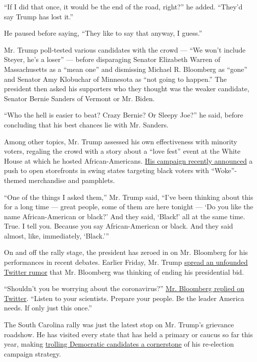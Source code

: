 ``If I did that once, it would be the end of the road, right?'' he
added. ``They'd say Trump has lost it.''

He paused before saying, ``They like to say that anyway, I guess.''

Mr. Trump poll-tested various candidates with the crowd --- ``We won't
include Steyer, he's a loser'' --- before disparaging Senator Elizabeth
Warren of Massachusetts as a ``mean one'' and dismissing Michael R.
Bloomberg as ``gone'' and Senator Amy Klobuchar of Minnesota as ``not
going to happen.'' The president then asked his supporters who they
thought was the weaker candidate, Senator Bernie Sanders of Vermont or
Mr. Biden.

``Who the hell is easier to beat? Crazy Bernie? Or Sleepy Joe?'' he
said, before concluding that his best chances lie with Mr. Sanders.

Among other topics, Mr. Trump assessed his own effectiveness with
minority voters, regaling the crowd with a story about a ``love fest''
event at the White House at which he hosted African-Americans.
\href{https://www.nytimes3xbfgragh.onion/2020/02/26/us/politics/trump-campaign-black-voters.html}{His
campaign recently announced} a push to open storefronts in swing states
targeting black voters with ``Woke''-themed merchandise and pamphlets.

``One of the things I asked them,'' Mr. Trump said, ``I've been thinking
about this for a long time --- great people, some of them are here
tonight --- `Do you like the name African-American or black?' And they
said, `Black!' all at the same time. True. I tell you. Because you say
African-American or black. And they said almost, like, immediately,
`Black.'''

On and off the rally stage, the president has zeroed in on Mr. Bloomberg
for his performances in recent debates. Earlier Friday, Mr. Trump
\href{https://twitter.com/realDonaldTrump/status/1233229450881445889}{spread
an unfounded Twitter rumor} that Mr. Bloomberg was thinking of ending
his presidential bid.

``Shouldn't you be worrying about the coronavirus?''
\href{https://twitter.com/MikeBloomberg/status/1233496512451272707?s=20}{Mr.
Bloomberg replied on Twitter}. ``Listen to your scientists. Prepare your
people. Be the leader America needs. If only just this once.''

The South Carolina rally was just the latest stop on Mr. Trump's
grievance roadshow. He has visited every state that has held a primary
or caucus so far this year, making
\href{https://www.nytimes3xbfgragh.onion/2020/02/19/us/politics/trump-phoenix-rally.html}{trolling
Democratic candidates a cornerstone} of his re-election campaign
strategy.

